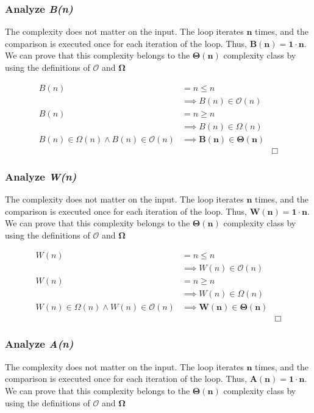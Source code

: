\documentclass[10pt]{article}
\begin{document}
\subsubsection{Analyze \textit{B(n)}}
\indent \indent The complexity does not matter on the input. The loop iterates $\mathbf{n}$ times, and the comparison is executed once for each iteration of the loop. Thus, $\mathbf{B(n) = 1 \cdot n}$. We can prove that this complexity belongs to the  $\mathbf{\Theta(n)}$ complexity class by using the definitions of $\boldsymbol{\mathcal{O}}$ and $\mathbf{\Omega}$

\begin{align*}
B(n) &= n \le n &\\
 &\implies B(n) \in \mathcal{O}(n) &\\
B(n) &= n \ge n &\\
 &\implies B(n) \in \Omega(n) &\\
 B(n) \in \Omega(n) \land B(n) \in \mathcal{O}(n) &\implies \mathbf{B(n) \boldsymbol{\in} \Theta(n)} &\\
 & &\Box
\end{align*}

\subsubsection{Analyze \textit{W(n)}}
\indent \indent The complexity does not matter on the input. The loop iterates $\mathbf{n}$ times, and the comparison is executed once for each iteration of the loop. Thus, $\mathbf{W(n) = 1 \cdot n}$. We can prove that this complexity belongs to the  $\mathbf{\Theta(n)}$ complexity class by using the definitions of $\boldsymbol{\mathcal{O}}$ and $\mathbf{\Omega}$

\begin{align*}
W(n) &= n \le n &\\
 &\implies W(n) \in \mathcal{O}(n) &\\
W(n) &= n \ge n &\\
 &\implies W(n) \in \Omega(n) &\\
 W(n) \in \Omega(n) \land W(n) \in \mathcal{O}(n) &\implies \mathbf{W(n) \boldsymbol{\in} \Theta(n)} &\\
 & &\Box
\end{align*}


\subsubsection{Analyze \textit{A(n)}}
\indent \indent The complexity does not matter on the input. The loop iterates $\mathbf{n}$ times, and the comparison is executed once for each iteration of the loop. Thus, $\mathbf{A(n) = 1 \cdot n}$. We can prove that this complexity belongs to the  $\mathbf{\Theta(n)}$ complexity class by using the definitions of $\boldsymbol{\mathcal{O}}$ and $\mathbf{\Omega}$
\end{document}
